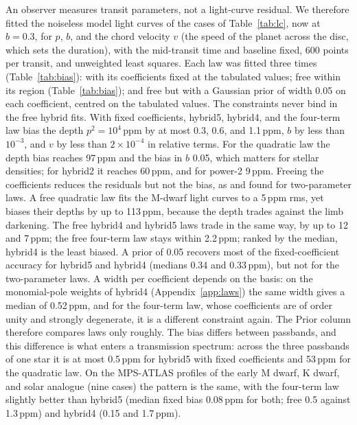 \documentclass{aa}
\newcommand{\ppm}{\,\textrm{ppm}}
\begin{document}
An observer measures transit parameters, not a light-curve residual. We
therefore fitted the noiseless model light curves of the cases of
Table~\ref{tab:lc}, now at $b=0.3$, for $p$, $b$, and the chord velocity $v$
(the speed of the planet across the disc, which sets the duration), with the
mid-transit time and baseline fixed, 600 points per transit, and unweighted
least squares. Each law was fitted three times (Table~\ref{tab:bias}): with its
coefficients fixed at the tabulated values; free within its region
(Table~\ref{tab:bias}); and free but with a Gaussian prior of
width 0.05 on each coefficient, centred on the tabulated values. The
constraints never bind in the free hybrid fits. With fixed coefficients,
hybrid5, hybrid4, and the four-term law bias the depth $p^2=10^4\ppm$ by at
most 0.3, 0.6, and 1.1\ppm, $b$ by less than $10^{-3}$, and $v$ by less
than $2\times10^{-4}$ in relative terms. For the quadratic law the depth bias
reaches 97\ppm{} and the bias in $b$ 0.05, which matters for stellar densities;
for hybrid2 it reaches 60\ppm, and for power-2 9\ppm. Freeing the coefficients
reduces the residuals but not the bias, as \citet{howarth2011} and
\citet{espinoza2016} found for two-parameter laws. A free quadratic law fits
the M-dwarf light curves to a 5\ppm{} rms, yet biases their depths by up to
113\ppm, because the depth trades against the limb darkening. The free hybrid4
and hybrid5 laws trade in the same way, by up to 12 and 7\ppm; the free
four-term law stays within 2.2\ppm; ranked by the median, hybrid4 is the
least biased. A prior of 0.05 recovers most of the fixed-coefficient accuracy
for hybrid5 and hybrid4 (medians 0.34 and 0.33\ppm), but not for the
two-parameter laws. A width per coefficient depends on the basis: on the
monomial-pole weights of hybrid4 (Appendix~\ref{app:laws}) the same width
gives a median of 0.52\ppm, and for the four-term law, whose coefficients are
of order unity and strongly degenerate, it is a different constraint again.
The Prior column therefore compares laws only roughly. The bias
differs between passbands, and this difference is what enters a transmission
spectrum: across the three passbands of one star it is at most 0.5\ppm{} for
hybrid5 with fixed coefficients and 53\ppm{} for the quadratic law. On the
MPS-ATLAS profiles of the early M dwarf, K dwarf, and solar analogue (nine cases)
the pattern is the same,
with the four-term law slightly better than hybrid5 (median fixed bias
0.08\ppm{} for both; free 0.5 against 1.3\ppm) and hybrid4 (0.15 and
1.7\ppm).
\end{document}
